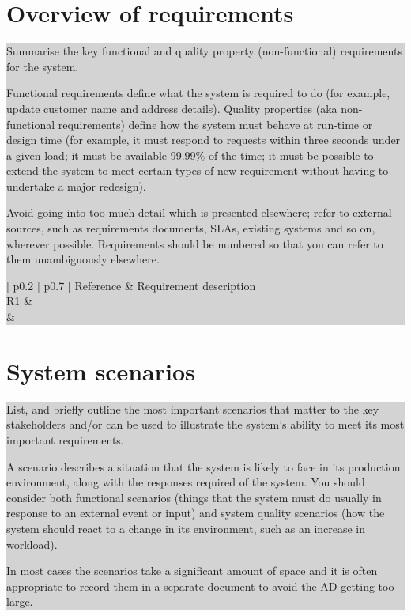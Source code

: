 \documentclass[a4paper,11pt]{report}
\newcommand{\instructions}[1]{
  \noindent\colorbox{lightgray}{%
    \parbox{\linewidth}{%
      #1
    }%
  }%
 \vspace{0.1cm}
}
\begin{document}
\section{Overview of requirements}
\label{sec:overv-requ}

\instructions{
  Summarise the key functional and quality property (non-functional)
  requirements for the system.

  Functional requirements define what the system is required to do (for
  example, update customer name and address details). Quality properties
  (aka non-functional requirements) define how the system must behave at
  run-time or design time (for example, it must respond to requests
  within three seconds under a given load; it must be available 99.99\%
  of the time; it must be possible to extend the system to meet certain
  types of new requirement without having to undertake a major
  redesign).

  Avoid going into too much detail which is presented elsewhere; refer
  to external sources, such as requirements documents, SLAs, existing
  systems and so on, wherever possible. Requirements should be numbered
  so that you can refer to them unambiguously elsewhere.


\begin{center}
  \begin{tabular}[h!]{| p{0.2\textwidth} | p{0.7\textwidth} |}
    \hline
    \rowcolor{gray}
    Reference & Requirement description \\
    \hline
    \hline
    R1 & \\
    \hline
    & \\
    \hline
  \end{tabular}
\end{center}

}

\section{System scenarios}
\label{sec:system-scenarios}

\instructions{
  List, and briefly outline the most important scenarios that matter to
  the key stakeholders and/or can be used to illustrate the system’s
  ability to meet its most important requirements.

  A scenario describes a situation that the system is likely to face in
  its production environment, along with the responses required of the
  system. You should consider both functional scenarios (things that the
  system must do usually in response to an external event or input) and
  system quality scenarios (how the system should react to a change in
  its environment, such as an increase in workload).

  In most cases the scenarios take a significant amount of space and it
  is often appropriate to record them in a separate document to avoid
  the AD getting too large.

}
\end{document}
